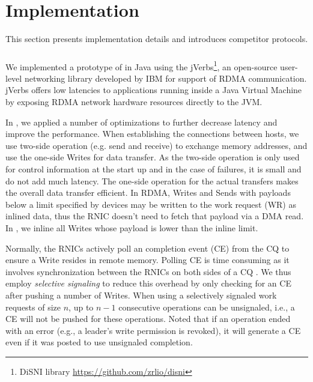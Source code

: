 \section{Implementation}
\label{sec:implementation}
This section presents implementation details and introduces competitor protocols.

\subsubsection*{\libname}

We implemented a prototype of \libname in Java using the jVerbs\footnote{DiSNI
library \url{https://github.com/zrlio/disni}}\cite{stuedi2013jverbs}, an
open-source user-level networking library developed by IBM for support of RDMA
communication. jVerbs offers low latencies to applications running inside a Java
Virtual Machine by exposing RDMA network hardware resources directly to the JVM.

In \libname, we applied a number of optimizations to further decrease latency
and improve the performance. When establishing the connections between hosts, we
use two-side operation (e.g. send and receive) to exchange memory addresses, and
use the one-side Writes for data transfer. As the two-side operation is only
used for control information at the start up and in the case of failures, it is
small and do not add much latency. The one-side operation for the actual
transfers makes the overall data transfer efficient. In RDMA, Writes and Sends
with payloads below a limit specified by devices may be written to the work
request (WR) as inlined data, thus the RNIC doesn't need to fetch that payload
via a DMA read. In \libname, we inline all Writes whose payload is lower than
the inline limit. 

Normally, the RNICs actively poll an completion event (CE) from the CQ to ensure
a Write resides in remote memory. Polling CE is time consuming as it involves
synchronization between the RNICs on both sides of a CQ \cite{APUS}. We thus
employ \emph{selective signaling} \cite{Kalia2014} to reduce this overhead by
only checking for an CE after pushing a number of Writes. When using a
selectively signaled work requests of size $n$, up to $n-1$ consecutive
operations can be unsignaled, i.e., a CE will not be pushed for these
operations. Noted that if an operation ended with an error (e.g., a leader's
write permission is revoked), it will generate a CE even if it was posted to use
unsignaled completion.

